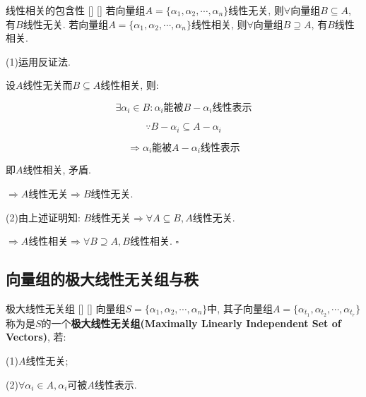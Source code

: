 \documentclass[UTF8]{ctexart}
\begin{document}
		\begin{ppt}
			[]
			{线性相关的包含性}
			[]
			[]
			若向量组$A=\{\alpha_{1}, \alpha_{2}, \cdots, \alpha_{n}\}$线性无关, 则$\forall$向量组$B\subseteq A$, 有$B$线性无关. 
			若向量组$A=\{\alpha_{1}, \alpha_{2}, \cdots, \alpha_{n}\}$线性相关, 则$\forall$向量组$B\supseteq A$, 有$B$线性相关. 
						
		\end{ppt}
		\begin{prf}
		
			(1)运用反证法. 
			
			设$A$线性无关而$B\subseteq A$线性相关, 则: 
			
			$$\exists \alpha_{i}\in B: \alpha_{i}\mbox{能被}B-\alpha_{i}\mbox{线性表示}$$
			
			$$\because B-\alpha_{i}\subseteq A-\alpha_{i}$$
			
			$$\Longrightarrow \alpha_{i}\mbox{能被}A-\alpha_{i}\mbox{线性表示}$$
			
			即$A$线性相关, 矛盾. 
			
			$\Longrightarrow A$线性无关$\Longrightarrow B$线性无关. 
			
			(2)由上述证明知: $B$线性无关$\Longrightarrow \forall A \subseteq B, A$线性无关. 
			
			$\Longrightarrow A$线性相关$\Longrightarrow \forall B \supseteq A, B$线性相关. $\square$
		\end{prf}
	\subsection{向量组的极大线性无关组与秩}
		
		\begin{dfn}
			[]
			{极大线性无关组}
			[]
			[]
			向量组$S=\{\alpha_{1}, \alpha_{2}, \cdots, \alpha_{n}\}$中, 其子向量组$A=\{\alpha_{t_{1}}, \alpha_{t_{2}}, \cdots, \alpha_{t_{r}}\}$称为是$S$的一个\textbf{极大线性无关组(Maximally Linearly Independent Set of Vectors)}, 若: 
			
			(1)$A$线性无关; 
			
			(2)$\forall \alpha_{i}\in A, \alpha_{i}$可被$A$线性表示. 
		
		\end{dfn}
			
\end{document}
